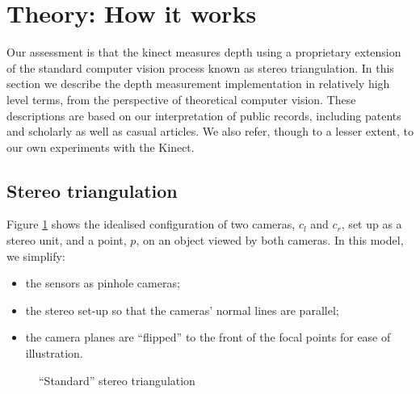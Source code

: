 \section{Theory: How it works}
\label{howitworks}

Our assessment is that the kinect measures depth using a proprietary extension
of the standard computer vision process known as stereo triangulation. In this
section we describe the depth measurement implementation in relatively high
level terms, from the perspective of theoretical computer vision. These
descriptions are based on our interpretation of public records, including
patents and scholarly as well as casual articles. We also refer, though to a
lesser extent, to our own experiments with the Kinect.


\subsection{Stereo triangulation}
\label{sub:triang}

Figure \ref{fig:triang} shows the idealised configuration of two cameras,
$c_{l}$ and $c_{r}$, set up as a stereo unit, and a point, $p$, on an object
viewed by both cameras. In this model, we simplify: 
\begin{itemize}

    \item   the sensors as pinhole cameras;

    \item   the stereo set-up so that the cameras' normal lines are parallel;

    \item   the camera planes are ``flipped'' to the front of the focal points
    for ease of illustration.

\end{itemize}

\begin{figure}[ht]
    \begin{center}
        
        \caption{``Standard'' stereo triangulation}
        \label{fig:triang}
    \end{center}
\end{figure}

